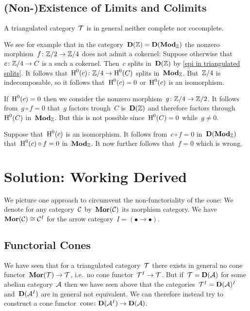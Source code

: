 \documentclass[a4paper,10pt]{scrartcl}
\begin{document}
\subsection{(Non-)Existence of Limits and Colimits}

A triangulated category~$\mathcal{T}$ is in general neither complete nor cocomplete.

We see for example that in the category~$\mathbf{D}(\mathbb{Z}) = \mathbf{D}(\mathbf{Mod}_{\mathbb{Z}})$ the nonzero morphism~$f \colon \mathbb{Z}/2 \to \mathbb{Z}/4$ does not admit a cokernel:
Suppose otherwise that~$c \colon \mathbb{Z}/4 \to C$ is a such a cokernel.
Then~$c$ splits in~$\mathbf{D}(\mathbb{Z})$ by \cref{epi in triangulated splits}.
It follows that~$\operatorname{H}^0(c) \colon \mathbb{Z}/4 \to \operatorname{H}^0(C)$ splits in~$\mathbf{Mod}_{\mathbb{Z}}$.
But~$\mathbb{Z}/4$ is indecomposable, so it follows that~$\operatorname{H}^0(c) = 0$ or~$\operatorname{H}^0(c)$ is an isomorphism.

If~$\operatorname{H}^0(c) = 0$ then we consider the nonzero morphism~$g \colon \mathbb{Z}/4 \to \mathbb{Z}/2$.
It follows from~$g \circ f = 0$ that~$g$ factors trough~$C$ is~$\mathbf{D}(\mathbb{Z})$ and therefore factors through~$\operatorname{H}^0(C)$ in~$\mathbf{Mod}_{\mathbb{Z}}$.
But this is not possible since~$\operatorname{H}^0(C) = 0$ while~$g \neq 0$.

Suppose that~$\operatorname{H}^0(c)$ is an isomorphism.
It follows from~$c \circ f = 0$ in~$\mathbf{D}(\mathbf{Mod}_{\mathbb{Z}})$ that~$\operatorname{H}^0(c) \circ f = 0$ in~$\mathbf{Mod}_{\mathbb{Z}}$.
It now further follows that~$f = 0$ which is wrong.





\section{Solution: Working Derived}

We picture one approach to circumvent the non-functoriality of the cone:
We denote for any category~$\mathcal{C}$ by~$\mathbf{Mor}(\mathcal{C})$ its morphism category.
We have~$\mathbf{Mor}(\mathcal{C}) \cong \mathcal{C}^I$ for the arrow category~$I = (\bullet \to \bullet)$.



\subsection{Functorial Cones}

We have seen that for a triangulated category~$\mathcal{T}$ there exists in general no cone functor~$\mathbf{Mor}(\mathcal{T}) \to \mathcal{T}$, i.e.\ no cone functor~$\mathcal{T}^I \to \mathcal{T}$.
But if~$\mathcal{T} = \mathbf{D}(\mathcal{A})$ for some abelian category~$\mathcal{A}$ then we have seen above that the categories~$\mathcal{T}^I = \mathbf{D}(\mathcal{A})^I$ and~$\mathbf{D}(\mathcal{A}^I)$ are in general not equivalent.
We can therefore instead try to construct a cone functor~$\operatorname{cone} \colon \mathbf{D}(\mathcal{A}^I) \to \mathbf{D}(\mathcal{A})$.
\end{document}
